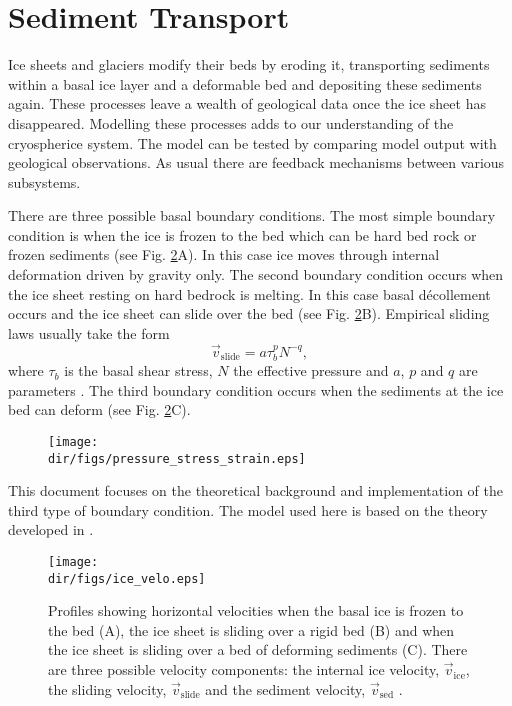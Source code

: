 \section{Sediment Transport}\label{erosion.sec.full_trans}
Ice sheets and glaciers modify their beds by eroding it, transporting sediments within a basal ice layer and a deformable bed and depositing these sediments again. These processes leave a wealth of geological data once the ice sheet has disappeared. Modelling these processes adds to our understanding of the cryospherice system. The model can be tested by comparing model output with geological observations. As usual there are feedback mechanisms between various subsystems.

There are three possible basal boundary conditions. The most simple boundary condition is when the ice is frozen to the bed which can be hard bed rock or frozen sediments (see Fig. \ref{erosion.fig.velos}A). In this case ice moves through internal deformation driven by gravity only.  The second boundary condition occurs when the ice sheet resting on hard bedrock is melting. In this case basal d\'ecollement occurs and the ice sheet can slide over the bed (see Fig. \ref{erosion.fig.velos}B). Empirical sliding laws usually take the form
\begin{equation}
  \vec{v}_{\text{slide}} = a\tau_b^pN^{-q},
\end{equation}
where $\tau_b$ is the basal shear stress, $N$ the effective pressure and $a$, $p$ and $q$ are parameters \citep{Paterson1994}. The third boundary condition occurs when the sediments at the ice bed can deform (see Fig. \ref{erosion.fig.velos}C).

\begin{figure}[htbp]
  \centering
  \texttt{[image: \\dir/figs/pressure\_stress\_strain.eps]}
  \label{fig.stress_etc}
\end{figure}

This document focuses on the theoretical background and implementation of the third type of boundary condition. The model used here is based on the theory developed in \citet{Boulton1996a}. 

\begin{figure}[htbp]
  \centering
  \texttt{[image: \\dir/figs/ice\_velo.eps]} 
  \caption{Profiles showing horizontal velocities when the basal ice is frozen to the bed (A), the ice sheet is sliding over a rigid bed (B) and when the ice sheet is sliding over a bed of deforming sediments (C). There are three possible velocity components: the internal ice velocity, $\vec{v}_{\text{ice}}$, the sliding velocity, $\vec{v}_{\text{slide}}$ and the sediment velocity, $\vec{v}_{\text{sed}}$ \citep[after][]{Boulton1996a}.}
  \label{erosion.fig.velos}
\end{figure}

